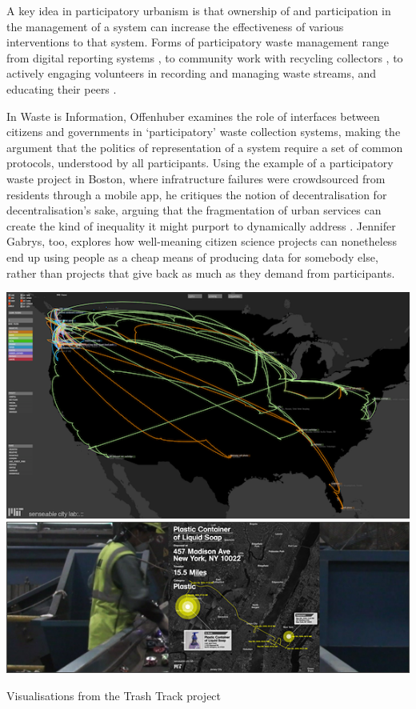 \documentclass[nofonts,nols,justified,nobib]{tufte-book}
\begin{document}
A key idea in participatory urbanism is that ownership of and participation in the management of a system can increase the effectiveness of various interventions to that system. Forms of participatory waste management range from digital reporting systems \cite{offenhuber_waste_2017}, to community work with recycling collectors \cite{tremblay_united_2010, mundano_pimp_nodate}, to actively engaging volunteers in recording and managing waste streams, and educating their peers \cite{offenhuber_waste_2017}. 

In Waste is Information, Offenhuber examines the role of interfaces between citizens and governments in `participatory' waste collection systems, making the argument that the politics of representation of a system require a set of common protocols, understood by all participants. Using the example of a participatory waste project in Boston, where infratructure failures were crowdsourced from residents through a mobile app, he critiques the notion of decentralisation for decentralisation's sake, arguing that the fragmentation of urban services can create the kind of inequality it might purport to dynamically address \cite{offenhuber_waste_2017}. Jennifer Gabrys, too, explores how well-meaning citizen science projects can nonetheless end up using people as a cheap means of producing data for somebody else, rather than projects that give back as much as they demand from participants. \cite{Gabrys_programming_2014}

\begin{marginfigure}
\includegraphics[width=\textwidth]{img/1/trashtrack1.png}
\includegraphics[width=\textwidth]{img/1/trashtrack2.jpg}
\caption{Visualisations from the Trash Track project \cite{ratti_trash_2009} \label{b}}
\end{marginfigure}
\end{document}
